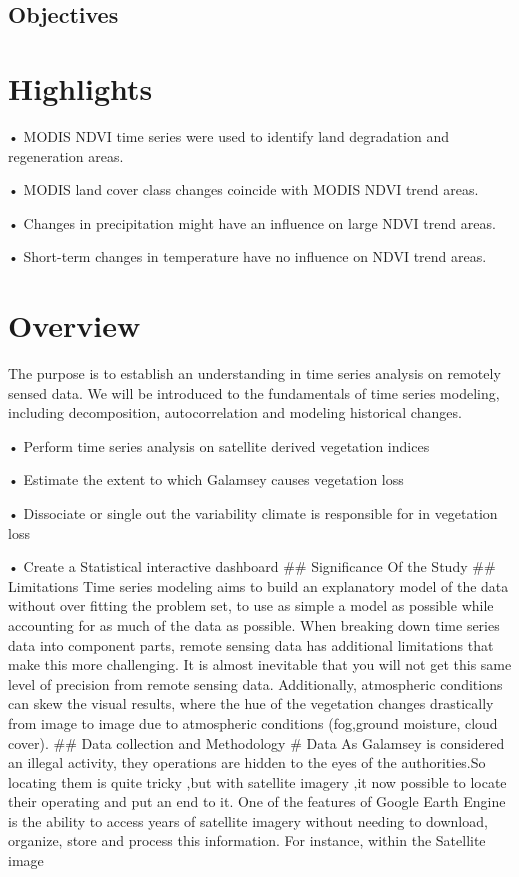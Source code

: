 \documentclass[
]{report}
\begin{document}
\hypertarget{objectives}{%
\subsection{Objectives}\label{objectives}}

\hypertarget{highlights}{%
\section{Highlights}\label{highlights}}

• MODIS NDVI time series were used to identify land degradation and
regeneration areas.

• MODIS land cover class changes coincide with MODIS NDVI trend areas.

• Changes in precipitation might have an influence on large NDVI trend
areas.

• Short-term changes in temperature have no influence on NDVI trend
areas.

\hypertarget{overview}{%
\section{Overview}\label{overview}}

The purpose is to establish an understanding in time series analysis on
remotely sensed data. We will be introduced to the fundamentals of time
series modeling, including decomposition, autocorrelation and modeling
historical changes.

• Perform time series analysis on satellite derived vegetation indices

• Estimate the extent to which Galamsey causes vegetation loss

• Dissociate or single out the variability climate is responsible for in
vegetation loss

• Create a Statistical interactive dashboard \#\# Significance Of the
Study \#\# Limitations Time series modeling aims to build an explanatory
model of the data without over fitting the problem set, to use as simple
a model as possible while accounting for as much of the data as
possible. When breaking down time series data into component parts,
remote sensing data has additional limitations that make this more
challenging. It is almost inevitable that you will not get this same
level of precision from remote sensing data. Additionally, atmospheric
conditions can skew the visual results, where the hue of the vegetation
changes drastically from image to image due to atmospheric conditions
(fog,ground moisture, cloud cover). \#\# Data collection and Methodology
\# Data As Galamsey is considered an illegal activity, they operations
are hidden to the eyes of the authorities.So locating them is quite
tricky ,but with satellite imagery ,it now possible to locate their
operating and put an end to it. One of the features of Google Earth
Engine is the ability to access years of satellite imagery without
needing to download, organize, store and process this information. For
instance, within the Satellite image
\end{document}
